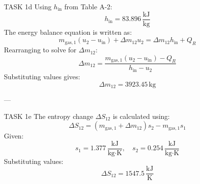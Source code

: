 TASK 1d  
Using \( h_{\text{in}} \) from Table A-2:  
\[
h_{\text{in}} = 83.896 \, \frac{\text{kJ}}{\text{kg}}
\]  
The energy balance equation is written as:  
\[
m_{\text{gas},1} (u_2 - u_{\text{in}}) + \Delta m_{12} u_2 = \Delta m_{12} h_{\text{in}} + Q_{R}
\]  
Rearranging to solve for \( \Delta m_{12} \):  
\[
\Delta m_{12} = \frac{m_{\text{gas},1} (u_2 - u_{\text{in}}) - Q_{R}}{h_{\text{in}} - u_2}
\]  
Substituting values gives:  
\[
\Delta m_{12} = 3923.45 \, \text{kg}
\]  

---

TASK 1e  
The entropy change \( \Delta S_{12} \) is calculated using:  
\[
\Delta S_{12} = (m_{\text{gas},1} + \Delta m_{12}) s_2 - m_{\text{gas},1} s_1
\]  
Given:  
\[
s_1 = 1.377 \, \frac{\text{kJ}}{\text{kg·K}}, \quad s_2 = 0.254 \, \frac{\text{kJ}}{\text{kg·K}}
\]  
Substituting values:  
\[
\Delta S_{12} = 1547.5 \, \frac{\text{kJ}}{\text{K}}
\]